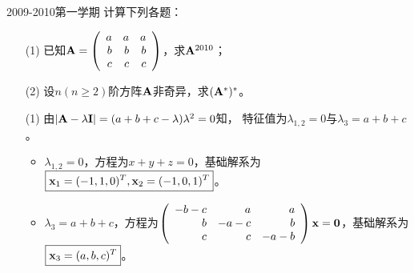 \begin{frame}
\begin{footnotesize}
\begin{exampleblock}{2009-2010第一学期}
计算下列各题：
\begin{itemize}
\item[(1)] 已知$\mathbf{A}=\left(
\begin{array}{rrr}
a&a&a\\
b&b&b\\
c&c&c
\end{array}
\right)$，求$\mathbf{A}^{2010}$；
\item[(2)] 设$n(n\ge2)$阶方阵$\mathbf{A}$非奇异，求$(\mathbf{A}^*)^*$。
\end{itemize}
\end{exampleblock}
\pause\jiename
\begin{itemize}
\item[(1)]由$|\mathbf{A}-\lambda\mathbf{I}|
=(a+b+c-\lambda)\lambda^2=0$知，
特征值为$\lambda_{1,2}=0$与$\lambda_3=a+b+c$。
\begin{itemize}
\item
$\lambda_{1,2}=0$，方程为$x+y+z=0$，基础解系为$\boxed{\mathbf{x}_1=(-1,1,0)^T,\mathbf{x}_2=(-1,0,1)^T}$。\\[0.1in]
\item
$\lambda_3=a+b+c$，方程为$\left(
\begin{array}{rrr}
-b-c&a&a\\
b&-a-c&b\\
c&c&-a-b
\end{array}
\right)\mathbf{x}=\mathbf{0}$，基础解系为$\boxed{\mathbf{x}_3=(a,b,c)^T}$。
\end{itemize}
\end{itemize}
\end{footnotesize}
\end{frame}

